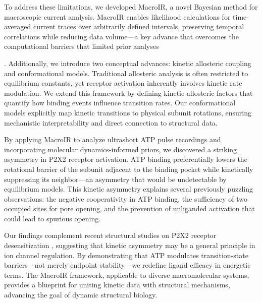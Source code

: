 \documentclass[pdflatex,sn-mathphys-num]{sn-jnl}%
\theoremstyle{thmstyleone}%
\theoremstyle{thmstyletwo}%
\theoremstyle{thmstylethree}%
\begin{document}
To address these limitations, we developed MacroIR, a novel Bayesian method for macroscopic current analysis. MacroIR enables likelihood calculations for time-averaged current traces over arbitrarily defined intervals, preserving temporal correlations while reducing data volume—a key advance that overcomes the computational barriers that limited prior analyses . Additionally, we introduce two conceptual advances: kinetic allosteric coupling and conformational models. Traditional allosteric analysis is often restricted to equilibrium constants, yet receptor activation inherently involves kinetic rate modulation. We extend this framework by defining kinetic allosteric factors that quantify how binding events influence transition rates. Our conformational models explicitly map kinetic transitions to physical subunit rotations, ensuring mechanistic interpretability and direct connection to structural data.

By applying MacroIR to analyze ultrashort ATP pulse recordings and incorporating molecular dynamics-informed priors, we discovered a striking asymmetry in P2X2 receptor activation. ATP binding preferentially lowers the rotational barrier of the subunit adjacent to the binding pocket while kinetically suppressing its neighbor—an asymmetry that would be undetectable by equilibrium models. This kinetic asymmetry explains several previously puzzling observations: the negative cooperativity in ATP binding, the sufficiency of two occupied sites for pore opening, and the prevention of unliganded activation that could lead to spurious opening.

Our findings complement recent structural studies on P2X2 receptor desensitization \cite{Samways2021}, suggesting that kinetic asymmetry may be a general principle in ion channel regulation. By demonstrating that ATP modulates transition-state barriers—not merely endpoint stability—we redefine ligand efficacy in energetic terms. The MacroIR framework, applicable to diverse macromolecular systems, provides a blueprint for uniting kinetic data with structural mechanisms, advancing the goal of dynamic structural biology.
\end{document}
